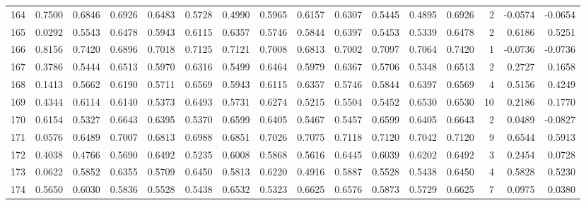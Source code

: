 \begin{tabular}{lrrrrrrrrrrrrrrr}
164 &      0.7500 &  0.6846 &  0.6926 &  0.6483 &  0.5728 &  0.4990 &  0.5965 &  0.6157 &  0.6307 &  0.5445 &   0.4895 &     0.6926 &      2 &                   -0.0574 &                    -0.0654 \\
165 &      0.0292 &  0.5543 &  0.6478 &  0.5943 &  0.6115 &  0.6357 &  0.5746 &  0.5844 &  0.6397 &  0.5453 &   0.5339 &     0.6478 &      2 &                    0.6186 &                     0.5251 \\
166 &      0.8156 &  0.7420 &  0.6896 &  0.7018 &  0.7125 &  0.7121 &  0.7008 &  0.6813 &  0.7002 &  0.7097 &   0.7064 &     0.7420 &      1 &                   -0.0736 &                    -0.0736 \\
167 &      0.3786 &  0.5444 &  0.6513 &  0.5970 &  0.6316 &  0.5499 &  0.6464 &  0.5979 &  0.6367 &  0.5706 &   0.5348 &     0.6513 &      2 &                    0.2727 &                     0.1658 \\
168 &      0.1413 &  0.5662 &  0.6190 &  0.5711 &  0.6569 &  0.5943 &  0.6115 &  0.6357 &  0.5746 &  0.5844 &   0.6397 &     0.6569 &      4 &                    0.5156 &                     0.4249 \\
169 &      0.4344 &  0.6114 &  0.6140 &  0.5373 &  0.6493 &  0.5731 &  0.6274 &  0.5215 &  0.5504 &  0.5452 &   0.6530 &     0.6530 &     10 &                    0.2186 &                     0.1770 \\
170 &      0.6154 &  0.5327 &  0.6643 &  0.6395 &  0.5370 &  0.6599 &  0.6405 &  0.5467 &  0.5457 &  0.6599 &   0.6405 &     0.6643 &      2 &                    0.0489 &                    -0.0827 \\
171 &      0.0576 &  0.6489 &  0.7007 &  0.6813 &  0.6988 &  0.6851 &  0.7026 &  0.7075 &  0.7118 &  0.7120 &   0.7042 &     0.7120 &      9 &                    0.6544 &                     0.5913 \\
172 &      0.4038 &  0.4766 &  0.5690 &  0.6492 &  0.5235 &  0.6008 &  0.5868 &  0.5616 &  0.6445 &  0.6039 &   0.6202 &     0.6492 &      3 &                    0.2454 &                     0.0728 \\
173 &      0.0622 &  0.5852 &  0.6355 &  0.5709 &  0.6450 &  0.5813 &  0.6220 &  0.4916 &  0.5887 &  0.5528 &   0.5438 &     0.6450 &      4 &                    0.5828 &                     0.5230 \\
174 &      0.5650 &  0.6030 &  0.5836 &  0.5528 &  0.5438 &  0.6532 &  0.5323 &  0.6625 &  0.6576 &  0.5873 &   0.5729 &     0.6625 &      7 &                    0.0975 &                     0.0380 \\

\end{tabular}
